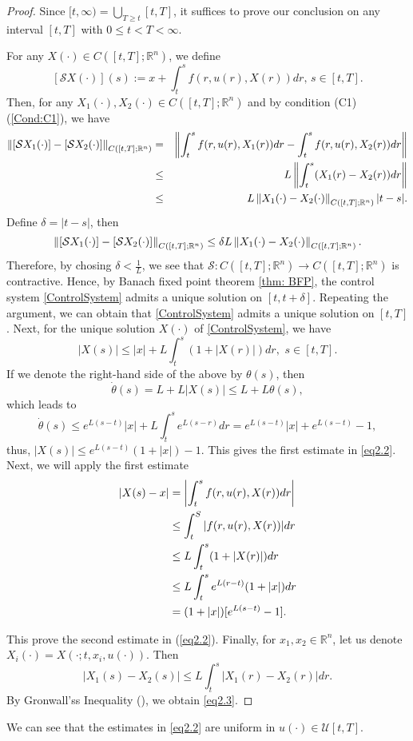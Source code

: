     \begin{proof}
        Since $[t,\infty)=\bigcup_{T\geq t}[t,T]$, it suffices to prove our conclusion 
        on any interval $[t,T]$ with $0\leq t<T<\infty$.
        
        For any $X(\cdot)\in C([t,T];\mathbb{R}^n)$, we define
        $$
            [\mathcal{S}X(\cdot)](s):=x+\int_{t}^{s}f(r,u(r),X(r))dr,\,s\in [t,T].
        $$
        Then, for any $X_1(\cdot),X_2(\cdot)\in C([t,T];\mathbb{R}^n)$ and by condition 
        (C1) (\ref{Cond:C1}), we have
        \begin{eqnarray*}
            \norm{[\mathcal{S}X_1(\cdot)]-[\mathcal{S}X_2(\cdot)]}_{C([t,T];\mathbb{R}^n)}%
            &=& \norm{ \int_{t}^{s}f(r,u(r),X_1(r))dr-\int_{t}^{s}f(r,u(r),X_2(r))dr}   \\ 
            &\leq& L \norm{\int_{t}^{s} (X_1(r)-X_2(r)) dr} \\
            &\leq& L \norm{X_1(\cdot)-X_2(\cdot)}_{C([t,T];\mathbb{R}^n)}|t-s|.
        \end{eqnarray*}
        Define $\delta=|t-s|$, then
        $$
            \norm{[\mathcal{S}X_1(\cdot)]-[\mathcal{S}X_2(\cdot)]}_{C([t,T] ; \mathbb{R}^n)} %
            \leq \delta L\norm{X_1(\cdot)-X_2(\cdot)}_{C([t,T];\mathbb{R}^n)}.
        $$
        Therefore, by chosing $\delta<\frac{1}{L}$, we see that $\mathcal{S}: C([t,T];%
        \mathbb{R}^n) \to C([t,T];\mathbb{R}^n)$ is contractive. Hence, by Banach fixed
        point theorem \cref{thm: BFP}, the control system \cref{ControlSystem} admits 
        a unique solution on $[t,t+\delta]$. Repeating the argument, we can obtain that 
        \cref{ControlSystem} admits a unique solution on $[t,T]$.
        Next, for the unique solution $X(\cdot)$ of \cref{ControlSystem}, we have
        $$
            |X(s)|\leq |x| + L \int_{t}^{s}(1 + |X(r)|)dr, \, \, s\in [t,T].
        $$
        If we denote the right-hand side of the above by $\theta(s)$, then
        $$
            \dot{\theta}(s)=L+L|X(s)|\leq L+L\theta(s),
        $$
        which leads to
        $$
            \dot{\theta}(s)\leq e^{L(s-t)}|x| + L\int_{t}^{s}e^{L(s-r)} dr = %
            e^{L(s-t)}|x|+e^{L(s-t)}-1,
        $$
        thus, $|X(s)|\leq e^{L(s-t)}(1+|x|)-1$. This gives the first estimate in \cref{eq2.2}. 
        Next, we will apply the first estimate
        \begin{align*}
            |X(s)-x| &=     \left\lvert\int_{t}^{s}f(r,u(r),X(r))dr\right\rvert \\
                    &\leq   \int_{t}^{S}|f(r,u(r),X(r))|dr  \\
                    &\leq   L\int_{t}^{s}(1+|X(r)|)dr \\
                    &\leq   L\int_{t}^{s}e^{L(r-t)}(1+|x|)dr\\
            &= (1+|x|)[e^{L(s-t)}-1].
        \end{align*}
        
        This prove the second estimate in (\ref{eq2.2}). Finally, for $x_1,x_2\in \mathbb{R}^n$, 
        let us denote $X_i(\cdot)=X(\cdot;t,x_i,u(\cdot))$. Then
        $$
            |X_1(s)-X_2(s)|\leq L\int_{t}^{s} |X_1(r)-X_2(r)|dr.
        $$
        By Gronwall'ss Inequality (), we obtain \cref{eq2.3}.
    \end{proof}
    We can see that the estimates in \cref{eq2.2} are uniform in $u(\cdot)\in \mathcal{U}[t,T]$. 

